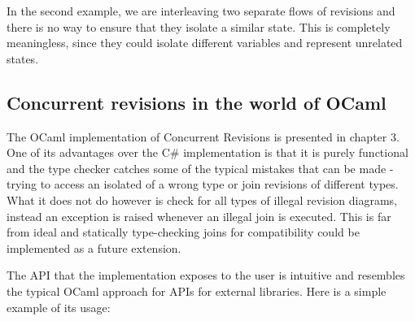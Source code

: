 \documentclass[12pt,twoside,notitlepage]{report}
\begin{document}
In the second example, we are interleaving two separate flows of revisions and there is no way to ensure that they isolate a similar state. This is completely meaningless, since they could isolate different variables and represent unrelated states.

\subsection{Concurrent revisions in the world of OCaml}

\label{rev_in_ocaml}
The OCaml implementation of Concurrent Revisions is presented in chapter 3. One of its advantages over the C\# implementation is that it is purely functional and the type checker catches some of the typical mistakes that can be made - trying to access an isolated of a wrong type or join revisions of different types. What it does not do however is check for all types of illegal revision diagrams, instead an exception is raised whenever an illegal join is executed. This is far from ideal and statically type-checking joins for compatibility could be implemented as a future extension.

The API that the implementation exposes to the user is intuitive and resembles the typical OCaml approach for APIs for external libraries. Here is a simple example of its usage:
\begin{comment}
module IntRevision = Make(struct
    type t = int
    let merge head parent current = head + current - parent
  end)

let () =
  let r = IntRevision.init () in
  let res1 = IntRevision.create r 0 in
  let revision = IntRevision.get_revision res1 
   and account = IntRevision.get_isolated res1 in
     Deferred.both 
      (IntRevision.fork revision 
        (fun r -> 
          return (IntRevision.write r account 
                    ((IntRevision.read r account) + 5)))
      (IntRevision.fork revision 
        (fun r -> 
          return (IntRevision.write r account 
                    ((IntRevision.read r account) + 10)))
     >>|(fun (rev1, rev2 ->
        let join_rev1 = IntRevision.join revision rev1 in
        let join_rev2 = Intrevision.join join_rev1 rev2 in
          assert(IntRevision.read join_rev2 = 15)    
\end{comment}
\end{document}
